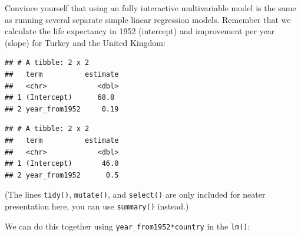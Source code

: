 \documentclass[]{book}
\makeatletter
\newenvironment{Shaded}{\begin{snugshade}}{\end{snugshade}}
\newcommand{\DataTypeTok}[1]{\textcolor[rgb]{0.13,0.29,0.53}{#1}}
\newcommand{\DecValTok}[1]{\textcolor[rgb]{0.00,0.00,0.81}{#1}}
\newcommand{\KeywordTok}[1]{\textcolor[rgb]{0.13,0.29,0.53}{\textbf{#1}}}
\newcommand{\NormalTok}[1]{#1}
\newcommand{\OperatorTok}[1]{\textcolor[rgb]{0.81,0.36,0.00}{\textbf{#1}}}
\newcommand{\StringTok}[1]{\textcolor[rgb]{0.31,0.60,0.02}{#1}}
\newenvironment{kframe}{%
\medskip{}
\setlength{\fboxsep}{.8em}
 \def\at@end@of@kframe{}%
 \ifinner\ifhmode%
  \def\at@end@of@kframe{\end{minipage}}%
  \begin{minipage}{\columnwidth}%
 \fi\fi%
 \def\FrameCommand##1{\hskip\@totalleftmargin \hskip-\fboxsep
 \colorbox{shadecolor}{##1}\hskip-\fboxsep
     \hskip-\linewidth \hskip-\@totalleftmargin \hskip\columnwidth}%
 \MakeFramed {\advance\hsize-\width
   \@totalleftmargin\z@ \linewidth\hsize
   \@setminipage}}%
 {\par\unskip\endMakeFramed%
 \at@end@of@kframe}
\renewenvironment{Shaded}{\begin{kframe}}{\end{kframe}}
\theoremstyle{definition}
\theoremstyle{definition}
\theoremstyle{definition}
\theoremstyle{remark}
\makeatother
\begin{document}
Convince yourself that using an fully interactive multivariable model is
the same as running several separate simple linear regression models.
Remember that we calculate the life expectancy in 1952 (intercept) and
improvement per year (slope) for Turkey and the United Kingdom:

\begin{Shaded}
\end{Shaded}

\begin{verbatim}
## # A tibble: 2 x 2
##   term          estimate
##   <chr>            <dbl>
## 1 (Intercept)      68.8 
## 2 year_from1952     0.19
\end{verbatim}

\begin{Shaded}
\end{Shaded}

\begin{verbatim}
## # A tibble: 2 x 2
##   term          estimate
##   <chr>            <dbl>
## 1 (Intercept)       46.0
## 2 year_from1952      0.5
\end{verbatim}

(The lines \texttt{tidy()}, \texttt{mutate()}, and \texttt{select()} are
only included for neater presentation here, you can use
\texttt{summary()} instead.)

We can do this together using \texttt{year\_from1952*country} in the
\texttt{lm()}:
\end{document}
